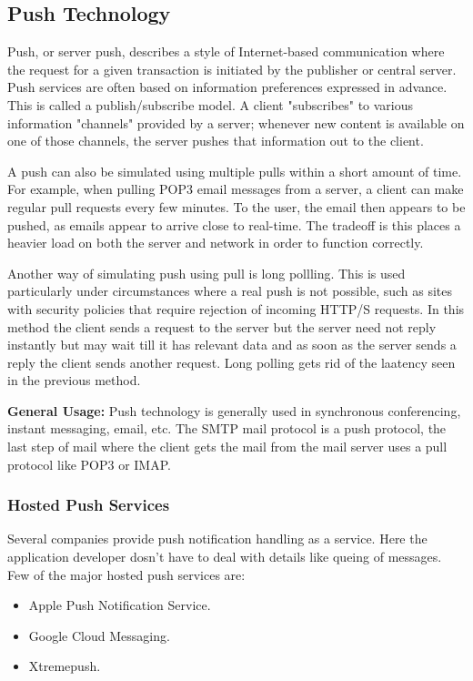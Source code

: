 \subsection{Push Technology}
Push, or server push, describes a style of Internet-based communication where the request for a given transaction is initiated by the publisher or central server. Push services are often based on information preferences expressed in advance. This is called a publish/subscribe model. A client "subscribes" to various information "channels" provided by a server; whenever new content is available on one of those channels, the server pushes that information out to the client.

A push can also be simulated using multiple pulls within a short amount of time. For example, when pulling POP3 email messages from a server, a client can make regular pull requests every few minutes. To the user, the email then appears to be pushed, as emails appear to arrive close to real-time. The tradeoff is this places a heavier load on both the server and network in order to function correctly.

Another way of simulating push using pull is long pollling. This is used particularly under circumstances where a real push is not possible, such as sites with security policies that require rejection of incoming HTTP/S requests. In this method the client sends a request to the server but the server need not reply instantly but may wait till it has relevant data and as soon as the server sends a reply the client sends another request. Long polling gets rid of the laatency seen in the previous method.

\textbf{General Usage: }Push technology is generally used in synchronous conferencing, instant messaging, email, etc. The SMTP mail protocol is a push protocol, the last step of mail where the client gets the mail from the mail server uses a pull protocol like POP3 or IMAP.
\subsubsection{Hosted Push Services} 
Several companies provide push notification handling as a service. Here the application developer dosn't have to deal with details like queing of messages. Few of the major hosted push services are:
\begin{itemize}
    \item Apple Push Notification Service.
    \item Google Cloud Messaging.
    \item Xtremepush.
  \end{itemize}
